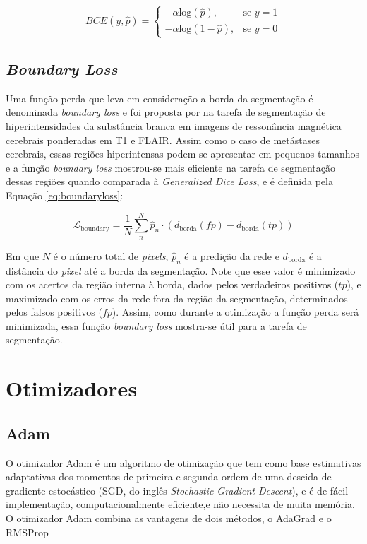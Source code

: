 \begin{equation}\label{eq:bce}
    BCE(y,\hat{p}) = \begin{cases}
    -\alpha\text{log}(\hat{p}), & \text{se $y=1$}\\
    -\alpha\text{log}(1-\hat{p}), & \text{se $y=0$}
    \end{cases}
\end{equation}

\subsection{\textit{Boundary Loss}}

Uma função perda que leva em consideração a borda da segmentação é denominada \textit{boundary loss} e foi proposta por \cite{Kervadec:2021} na tarefa de segmentação de hiperintensidades da substância branca em imagens de ressonância magnética cerebrais ponderadas em T1 e FLAIR. Assim como o caso de metástases cerebrais, essas regiões hiperintensas podem se apresentar em pequenos tamanhos e a função \textit{boundary loss} mostrou-se mais eficiente na tarefa de segmentação dessas regiões quando comparada à \textit{Generalized Dice Loss}, e é definida pela Equação \ref{eq:boundaryloss}:

\begin{equation}\label{eq:boundaryloss}
    \mathcal{L}_{\text{boundary}}= \frac{1}{N}\sum_n^N \hat{p}_n \cdot(d_{\text{borda}}(fp) - d_{\text{borda}}(tp)) 
\end{equation}

Em que $N$ é o número total de \textit{pixels}, $\hat{p}_n$ é a predição da rede e $d_{\text{borda}}$ é a distância do \textit{pixel} até a borda da segmentação. Note que esse valor é minimizado com os acertos da região interna à borda, dados pelos verdadeiros positivos ($tp$), e maximizado com os erros da rede fora da região da segmentação, determinados pelos falsos positivos ($fp$). Assim, como durante a otimização a função perda será minimizada, essa função \textit{boundary loss} mostra-se útil para a tarefa de segmentação. 

\section{Otimizadores}



\subsection{Adam}

O otimizador Adam \cite{Kingma:2014} é um algoritmo de otimização que tem como base estimativas adaptativas dos momentos de primeira e segunda ordem de uma descida de gradiente estocástico (SGD, do inglês \textit{Stochastic Gradient Descent}), e é de fácil implementação, computacionalmente eficiente,e não necessita de muita memória. O otimizador Adam combina as vantagens de dois métodos, o AdaGrad e o RMSProp

